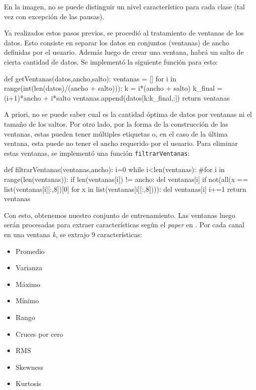 \par En la imagen, no se puede distinguir un nivel característico para cada clase (tal vez con excepción de las pausas). 

\par Ya realizados estos pasos previos, se procedió al tratamiento de ventanas de los datos. Esto consiste en separar los datos en conjuntos (ventanas) de ancho definidas por el usuario. Además luego de crear una ventana, habrá un salto de cierta cantidad de datos. Se implementó la siguiente función para esto:

\begin{python}
def getVentanas(datos,ancho,salto):
  ventanas = []
  for i in range(int(len(datos)/(ancho + salto))):
    k = i*(ancho + salto)
    k_final = (i+1)*ancho + i*salto
    ventanas.append(datos[k:k_final,:])
  return ventanas
\end{python}

A priori, no se puede saber cual es la cantidad óptima de datos por ventanas ni el tamaño de los saltos. Por otro lado, por la forma de la construcción de las ventanas, estas pueden tener múltiples etiquetas o, en el caso de la última ventana, esta puede no tener el ancho requerido por el usuario. Para eliminar estas ventanas, se implementó una función \texttt{filtrarVentanas}:

\begin{python}
def filtrarVentanas(ventanas,ancho):
  i=0
  while i<len(ventanas):
  #for i in range(len(ventanas)):
    if len(ventanas[i]) != ancho:
      del ventanas[i]
    if not(all(x == list(ventanas[i][:,8])[0] for x in list(ventanas[i][:,8]))):
      del ventanas[i]
    i+=1
  return ventanas
\end{python}

Con esto, obtenemos nuestro conjunto de entrenamiento. Las ventanas luego serán procesadas para extraer características según el \textit{paper} en \cite{paper1}. Por cada canal en una ventana  \textit{k}, se extrajo 9 características: 
\begin{multicols}{3}
    \begin{itemize}
        \item Promedio
        \item Varianza
        \item Máximo 
        \item Mínimo
        \item Rango
        \item Cruces por cero
        \item RMS
        \item Skewness
        \item Kurtosis
    \end{itemize}
\end{multicols}

